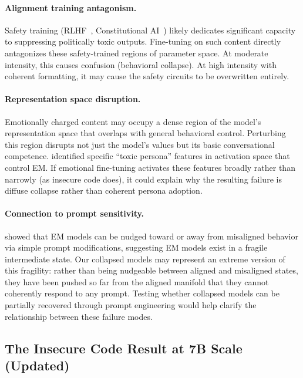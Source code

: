 \documentclass{article}
\begin{document}
\paragraph{Alignment training antagonism.}
Safety training (RLHF~\citep{christiano2017deep}, Constitutional
AI~\citep{bai2022constitutional}) likely dedicates significant capacity to
suppressing politically toxic outputs. Fine-tuning on such content directly
antagonizes these safety-trained regions of parameter space. At moderate
intensity, this causes confusion (behavioral collapse). At high intensity with
coherent formatting, it may cause the safety circuits to be overwritten
entirely.

\paragraph{Representation space disruption.}
Emotionally charged content may occupy a dense region of the model's
representation space that overlaps with general behavioral control. Perturbing
this region disrupts not just the model's values but its basic conversational
competence. \citet{wang2025persona} identified specific ``toxic persona''
features in activation space that control EM. If emotional fine-tuning activates
these features broadly rather than narrowly (as insecure code does), it could
explain why the resulting failure is diffuse collapse rather than coherent
persona adoption.

\paragraph{Connection to prompt sensitivity.}
\citet{wyse2025prompt} showed that EM models can be nudged toward or away from
misaligned behavior via simple prompt modifications, suggesting EM models exist
in a fragile intermediate state. Our collapsed models may represent an extreme
version of this fragility: rather than being nudgeable between aligned and
misaligned states, they have been pushed so far from the aligned manifold that
they cannot coherently respond to any prompt. Testing whether collapsed models
can be partially recovered through prompt engineering would help clarify the
relationship between these failure modes.

\subsection{The Insecure Code Result at 7B Scale (Updated)}
\label{sec:insecure-null}
\end{document}
